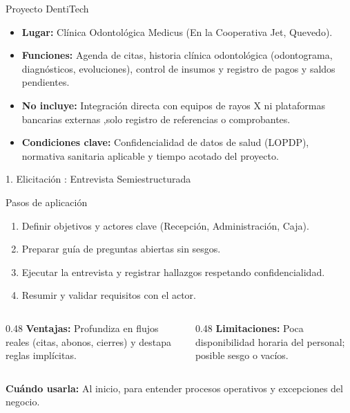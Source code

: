 \documentclass[aspectratio=169,10pt]{beamer}
\subtitle{Proyecto DentiTech  Clínica Odontológica Medicus}
\author{Nombre:Fuertes Clavo Landy Lorena}
\institute{Universidad Tecnica Estatal De Quevedo}
\date{}
\begin{document}
\begin{frame}
  \titlepage
\end{frame}

\begin{frame}{ Proyecto  DentiTech}
  \begin{itemize}
    \item \textbf{Lugar:} Clínica Odontológica Medicus (En la Cooperativa Jet, Quevedo).
    \item \textbf{Funciones:} Agenda de citas, historia clínica odontológica (odontograma, diagnósticos, evoluciones), control de insumos y registro de pagos y saldos pendientes.
    \item \textbf{No incluye:} Integración directa con equipos de rayos X ni plataformas bancarias externas ,solo registro de referencias o comprobantes.
    \item \textbf{Condiciones clave:} Confidencialidad de datos de salud (LOPDP), normativa sanitaria aplicable y tiempo acotado del proyecto.
  \end{itemize}
\end{frame}

\begin{frame}{1. Elicitación : Entrevista Semiestructurada}
  \begin{block}{Pasos de aplicación}
    \begin{enumerate}
      \item Definir objetivos y actores clave (Recepción, Administración, Caja).
      \item Preparar guía de preguntas abiertas sin sesgos.
      \item Ejecutar la entrevista y registrar hallazgos respetando confidencialidad.
      \item Resumir y validar requisitos con el actor.
    \end{enumerate}
  \end{block}
  \begin{columns}[T]
    \begin{column}{0.48\textwidth}
      \textbf{Ventajas:} Profundiza en flujos reales (citas, abonos, cierres) y destapa reglas implícitas.
    \end{column}
    \begin{column}{0.48\textwidth}
      \textbf{Limitaciones:} Poca disponibilidad horaria del personal; posible sesgo o vacíos.
    \end{column}
  \end{columns}
  \vspace{0.2cm}
  \textbf{Cuándo usarla:} Al inicio, para entender procesos operativos y excepciones del negocio.
\end{frame}
\end{document}
